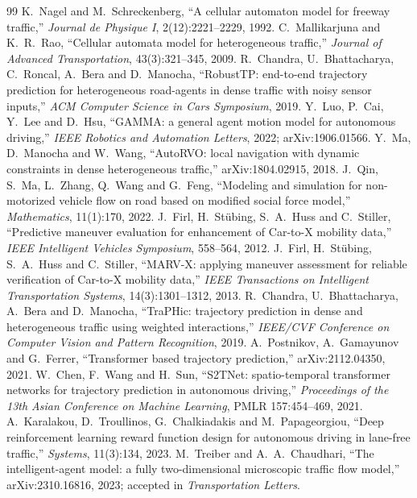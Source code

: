 \documentclass[11pt]{article}
\begin{document}
\begin{thebibliography}{99}
 K.~Nagel and M.~Schreckenberg, ``A cellular automaton model for
freeway traffic,'' \emph{Journal de Physique I}, 2(12):2221--2229, 1992.
 C.~Mallikarjuna and K.~R.~Rao, ``Cellular automata
model for heterogeneous traffic,'' \emph{Journal of Advanced Transportation},
43(3):321--345, 2009.
 R.~Chandra, U.~Bhattacharya, C.~Roncal, A.~Bera and
D.~Manocha, ``RobustTP: end-to-end trajectory prediction for heterogeneous
road-agents in dense traffic with noisy sensor inputs,'' \emph{ACM Computer
Science in Cars Symposium}, 2019.
 Y.~Luo, P.~Cai, Y.~Lee and D.~Hsu, ``GAMMA: a general agent
motion model for autonomous driving,'' \emph{IEEE Robotics and Automation
Letters}, 2022; arXiv:1906.01566.
 Y.~Ma, D.~Manocha and W.~Wang, ``AutoRVO: local navigation
with dynamic constraints in dense heterogeneous traffic,'' arXiv:1804.02915,
2018.
 J.~Qin, S.~Ma, L.~Zhang, Q.~Wang and G.~Feng, ``Modeling and
simulation for non-motorized vehicle flow on road based on modified social
force model,'' \emph{Mathematics}, 11(1):170, 2022.
 J.~Firl, H.~St\"ubing, S.~A.~Huss and C.~Stiller, ``Predictive
maneuver evaluation for enhancement of Car-to-X mobility data,'' \emph{IEEE
Intelligent Vehicles Symposium}, 558--564, 2012.
 J.~Firl, H.~St\"ubing, S.~A.~Huss and C.~Stiller, ``MARV-X:
applying maneuver assessment for reliable verification of Car-to-X mobility
data,'' \emph{IEEE Transactions on Intelligent Transportation Systems},
14(3):1301--1312, 2013.
 R.~Chandra, U.~Bhattacharya, A.~Bera and D.~Manocha,
``TraPHic: trajectory prediction in dense and heterogeneous traffic using
weighted interactions,'' \emph{IEEE/CVF Conference on Computer Vision and
Pattern Recognition}, 2019.
 A.~Postnikov, A.~Gamayunov and G.~Ferrer, ``Transformer
based trajectory prediction,'' arXiv:2112.04350, 2021.
 W.~Chen, F.~Wang and H.~Sun, ``S2TNet: spatio-temporal
transformer networks for trajectory prediction in autonomous driving,''
\emph{Proceedings of the 13th Asian Conference on Machine Learning}, PMLR
157:454--469, 2021.
 A.~Karalakou, D.~Troullinos, G.~Chalkiadakis and
M.~Papageorgiou, ``Deep reinforcement learning reward function design for
autonomous driving in lane-free traffic,'' \emph{Systems}, 11(3):134, 2023.
 M.~Treiber and A.~A.~Chaudhari, ``The intelligent-agent model: a
fully two-dimensional microscopic traffic flow model,'' arXiv:2310.16816, 2023;
accepted in \emph{Transportation Letters}.

\end{thebibliography}
\end{document}
